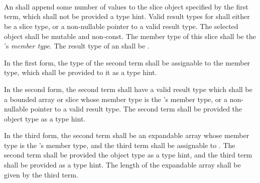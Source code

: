 
\begin{grammar}
 \\
	 \\
	 \\
	 \\

 \\
	  \terminal{(}  \terminal{,}  \terminal{)} \\
	  \terminal{(}  \terminal{,}   \terminal{)} \\
	  \terminal{(}  \terminal{,}  \terminal{,}  \terminal{)} \\
\end{grammar}

\specsubsubitem
An  shall append some number of values to the
slice object specified by the first term, which shall not be provided a type
hint. Valid result types for  shall either be a
slice type, or a non-nullable pointer to a valid result type. The selected
object shall be mutable and non-const. The member type of this slice shall be
the 's \textit{member type}. The result type of
an  shall be .

\specsubsubitem
In the first form, the type of the second term shall be assignable to the member
type, which shall be provided to it as a type hint.

\specsubsubitem
In the second form, the second term shall have a valid result type which
shall be a bounded array or slice whose member type is the
's member type, or a non-nullable pointer to a
valid result type. The second term shall be provided the object type as a type
hint.

\specsubsubitem
In the third form, the second term shall be an expandable array whose member
type is the 's member type, and the third term
shall be assignable to . The second term shall be provided the
object type as a type hint, and the third term shall be provided 
as a type hint. The length of the expandable array shall be given by the third
term.

